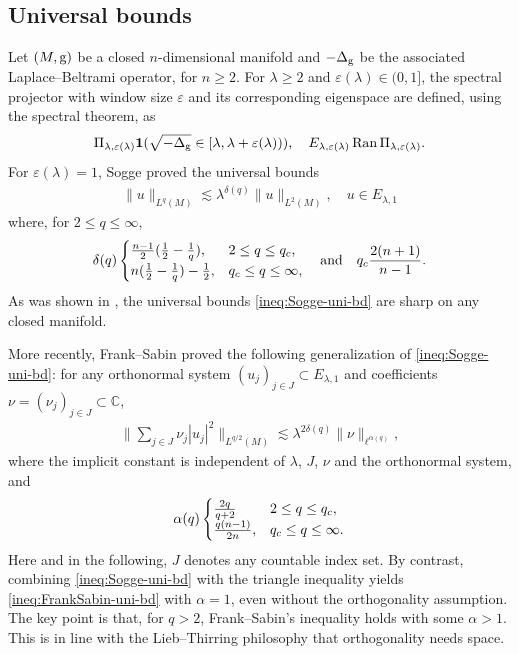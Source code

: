 \documentclass[12pt,reqno,a4paper]{amsart}
\let\coloneq\relax
\newcommand{\coloneq}{\coloneqq}
\newcommand{\Ran}{\mathop{\rm Ran}}
\newcommand{\g}{{\rm g}}
\begin{document}
\subsection{Universal bounds}
Let $(M, \g)$ be a  closed $n$-dimensional manifold and $-\Delta_\g $ be the associated Laplace--Beltrami operator, for $n\geq 2$.
For $\lambda\geq 2$ and $\varepsilon(\lambda)\in (0,1]$, the spectral projector with window size $\varepsilon$ and its corresponding eigenspace are defined, using the spectral theorem, as
\[
  \Pi_{\lambda,\varepsilon(\lambda)}\coloneq \mathbf{1}(\sqrt{-\Delta_\g}\in[\lambda,\lambda+\varepsilon(\lambda))), \quad E_{\lambda,\varepsilon(\lambda)}\coloneq\Ran\Pi_{\lambda,\varepsilon(\lambda)} .
\]
For $\varepsilon(\lambda)=1$, Sogge \cite{Sogge-1988} proved the universal bounds
\begin{align}\label{ineq:Sogge-uni-bd}
  \|u\|_{L^q(M)} \lesssim\lambda^{\delta(q)}\|u\|_{L^{2}(M)} ,\quad  
  u\in E_{\lambda,1}
\end{align}
where, for $2\leq q\leq\infty$,
\begin{align}\label{eq:delta(q)}
  \delta(q)\coloneq  \begin{cases}
    \frac{n-1}{2}(\frac{1}{2}-\frac{1}{q}), & 2\leq q\leq q_c ,\\
    n(\frac{1}{2} -\frac{1}{q})-\frac{1}{2},  & q_c\leq q \leq \infty ,
  \end{cases}
  \quad \text{and} \quad
  q_c\coloneq \frac{2(n+1)}{n-1} .
\end{align}
As was shown in \cite{MR3645429}, the universal  bounds \eqref{ineq:Sogge-uni-bd} are sharp on
any closed manifold.

More recently, Frank--Sabin \cite[Theorem 2]{FrankSabin-2017clust} proved the following generalization of \eqref{ineq:Sogge-uni-bd}: for any orthonormal system $(u_j)_{j\in J}\subset E_{\lambda,1}$ and coefficients $\nu=(\nu_j)_{j\in J}\subset\mathbb{C}$,
\begin{align}\label{ineq:FrankSabin-uni-bd}
  \bigg\|\sum_{j\in J}\nu_j |u_j|^2\bigg\|_{L^{q/2}(M)}\lesssim  \lambda^{2\delta(q)} \|\nu\|_{\ell^{\alpha(q)}} ,
\end{align}
where the implicit constant is independent of $\lambda$, $J$, $\nu$ and the orthonormal system, and
\begin{align}\label{eq:alpha-q}
  \alpha(q)\coloneq\begin{cases}
    \frac{2q}{q+2}& 2\leq q\leq q_c ,\\
    \frac{q(n-1)}{2n},  & q_c\leq q \leq \infty .
  \end{cases}
\end{align}
Here and in the following, $J$ denotes any countable index set. By contrast, combining \eqref{ineq:Sogge-uni-bd} with the triangle inequality yields \eqref{ineq:FrankSabin-uni-bd} with \(\alpha = 1\), even without the orthogonality assumption. The key point is that, for $q>2$, Frank--Sabin's inequality holds with some \(\alpha > 1\). This is in line with the Lieb--Thirring philosophy that orthogonality needs space.
\end{document}

